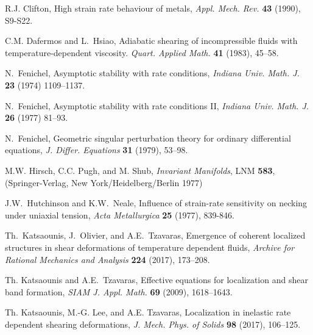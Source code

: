 \documentclass[a4paper,11pt]{article}
\theoremstyle{remark}
\begin{document}
{\begin{thebibliography}{10}
{\sc R.J. Clifton},  High strain rate behaviour of metals,
{\it Appl. Mech. Rev.}
{\bf 43} (1990), S9-S22.

{\sc C.M. Dafermos and L.~Hsiao},
Adiabatic shearing of incompressible fluids with temperature-dependent viscosity.
{\it Quart.  Applied Math.} {\bf 41} (1983), 45--58.


{\sc N.~Fenichel},
Asymptotic stability with rate conditions,
{\it Indiana Univ. Math. J.} {\bf 23} (1974) 1109--1137.

{\sc N.~Fenichel},
Asymptotic stability with rate conditions \textrm{II},
{\it Indiana Univ. Math. J.} {\bf 26} (1977) 81--93.

{\sc N.~Fenichel},
Geometric singular perturbation theory for ordinary differential equations,
{\it J. Differ. Equations} {\bf 31} (1979), 53--98.


{\sc M.W. Hirsch, C.C. Pugh, and M. Shub},
{\it Invariant Manifolds}, LNM {\bf 583}, (Springer-Verlag, New York/Heidelberg/Berlin 1977)

{\sc J.W.~Hutchinson and K.W.~Neale},
Influence of strain-rate sensitivity on necking under uniaxial tension,
{\it  Acta Metallurgica} {\bf 25} (1977), 839-846.

{\sc Th.~Katsaounis, J.~Olivier, and A.E.~Tzavaras},
Emergence of coherent localized structures in shear deformations of temperature dependent fluids,
{\it Archive for Rational Mechanics and Analysis} {\bf 224} (2017), 173--208.

{\sc Th. Katsaounis and A.E.~Tzavaras},
Effective equations for localization and shear band formation,
{\it SIAM J. Appl. Math.}  {\bf 69} (2009), 1618--1643.

{\sc Th. Katsaounis, M.-G. Lee, and A.E. Tzavaras},
Localization in inelastic rate dependent shearing deformations,
{\it J. Mech. Phys. of Solids} {\bf 98} (2017), 106--125.


\end{thebibliography}}
\end{document}
